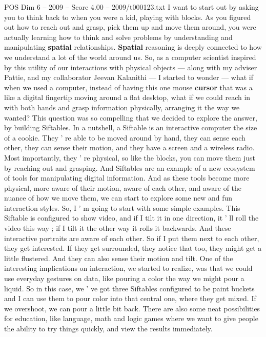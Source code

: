 \begin{textsample}{POS Dim 6 – 2009 – Score 4.00 – 2009/t000123.txt}  \label{ex:f6_pos_031}
I want to start out by asking you to think back to when you were a kid, playing with blocks.
As you figured out how to reach out and grasp, pick them up and move them around, you were actually learning how to think and solve problems by understanding and manipulating \textbf{spatial} relationships. \textbf{Spatial} reasoning is deeply connected to how we understand a lot of the world around us.
So, as a computer scientist inspired by this utility of our interactions with physical objects — along with my adviser Pattie, and my collaborator Jeevan Kalanithi — I started to wonder — what if when we used a computer, instead of having this one mouse \textbf{cursor} that was a like a digital fingertip moving around a flat desktop, what if we could reach in with both hands and grasp information physically, arranging it the way we wanted?
This question was so compelling that we decided to explore the answer, by building Siftables.
In a nutshell, a Siftable is an interactive computer the size of a cookie.
They ' re able to be moved around by hand, they can sense each other, they can sense their motion, and they have a screen and a wireless radio.
Most importantly, they ' re physical, so like the blocks, you can move them just by reaching out and grasping.
And Siftables are an example of a new ecosystem of tools for manipulating digital information.
And as these tools become more physical, more aware of their motion, aware of each other, and aware of the nuance of how we move them, we can start to explore some new and fun interaction styles.
So, I ' m going to start with some simple examples.
This Siftable is configured to show video, and if I tilt it in one direction, it ' ll roll the video this way ; if I tilt it the other way it rolls it backwards.
And these interactive portraits are aware of each other.
So if I put them next to each other, they get interested.
If they get surrounded, they notice that too, they might get a little flustered.
And they can also sense their motion and tilt.
One of the interesting implications on interaction, we started to realize, was that we could use everyday gestures on data, like pouring a color the way we might pour a liquid.
So in this case, we ' ve got three Siftables configured to be paint buckets and I can use them to pour color into that central one, where they get mixed.
If we overshoot, we can pour a little bit back.
There are also some neat possibilities for education, like language, math and logic games where we want to give people the ability to try things quickly, and view the results immediately.

\end{textsample}
